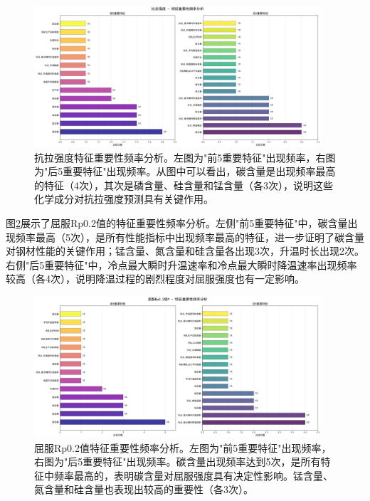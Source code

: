 \documentclass[12pt,a4paper]{article}
\begin{document}
\begin{figure}[H]
\centering
\includegraphics[width=0.95\textwidth]{fig/feature_frequency_analysis_tensile_strength.png}
\caption{抗拉强度特征重要性频率分析。左图为"前5重要特征"出现频率，右图为"后5重要特征"出现频率。从图中可以看出，碳含量是出现频率最高的特征（4次），其次是磷含量、硅含量和锰含量（各3次），说明这些化学成分对抗拉强度预测具有关键作用。}
\label{fig:feature_freq_kangla}
\end{figure}

图\ref{fig:feature_freq_qufu}展示了屈服Rp0.2值的特征重要性频率分析。左侧"前5重要特征"中，碳含量出现频率最高（5次），是所有性能指标中出现频率最高的特征，进一步证明了碳含量对钢材性能的关键作用；锰含量、氮含量和硅含量各出现3次，升温时长出现2次。右侧"后5重要特征"中，冷点最大瞬时升温速率和冷点最大瞬时降温速率出现频率较高（各4次），说明降温过程的剧烈程度对屈服强度也有一定影响。

\begin{figure}[H]
\centering
\includegraphics[width=0.95\textwidth]{fig/feature_frequency_analysis_yield_strength.png}
\caption{屈服Rp0.2值特征重要性频率分析。左图为"前5重要特征"出现频率，右图为"后5重要特征"出现频率。碳含量出现频率达到5次，是所有特征中频率最高的，表明碳含量对屈服强度具有决定性影响。锰含量、氮含量和硅含量也表现出较高的重要性（各3次）。}
\label{fig:feature_freq_qufu}
\end{figure}
\end{document}
